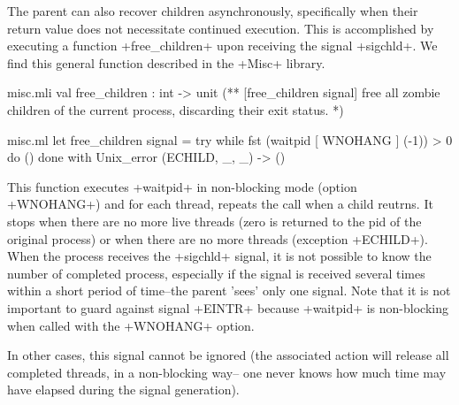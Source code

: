 \begin{example}
The parent can also recover children asynchronously, specifically
when their return value does not necessitate continued execution.
This is accomplished by executing a function \ml+free_children+ upon
receiving the signal \ml+sigchld+.  We find this general function 
described in the \ml+Misc+ library.


%
\begin{codefile}{misc.mli}
val free_children : int -> unit
(** [free_children signal] free all zombie children of the current process, 
    discarding their exit status. *)
\end{codefile}
%
\begin{listingcodefile}{misc.ml}
let free_children signal = 
  try while fst (waitpid [ WNOHANG ] (-1)) > 0 do () done 
  with Unix_error (ECHILD, _, _) -> ()
\end{listingcodefile}
%
This function executes \ml+waitpid+ in non-blocking mode 
(option \ml+WNOHANG+) and for each thread, repeats
the call when a child reutrns.  It stops when there are
no more live threads (zero is returned to the pid of the
original process) or when there are no more threads
(exception \ml+ECHILD+).  When the process receives the \ml+sigchld+ 
signal, it is not possible to know the number of completed process, 
especially if the signal is received several times within a short 
period of time--the parent 'sees' only one signal.  Note that it 
is not important to guard against signal \ml+EINTR+ because 
\ml+waitpid+ is non-blocking when called with the \ml+WNOHANG+ option.

In other cases, this signal cannot be ignored (the associated 
action will release all completed threads, in a non-blocking way--
one never knows how much time may have elapsed during the signal 
generation).
\end{example}

